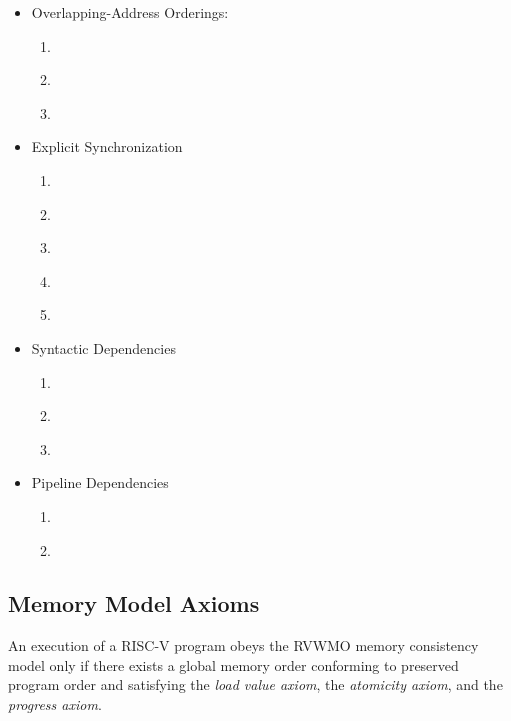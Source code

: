 \begin{itemize}
  \item Overlapping-Address Orderings:
    \begin{enumerate}
      \item\label{ppo:->st} \ppost
      \item\label{ppo:rdw} \ppordw
      \item\label{ppo:amoforward} \ppoamoforward
    \end{enumerate}
  \item Explicit Synchronization
    \begin{enumerate}[resume]
      \item\label{ppo:fence} \ppofence
      \item\label{ppo:acquire} \ppoacquire
      \item\label{ppo:release} \pporelease
      \item\label{ppo:rcsc} \pporcsc
      \item\label{ppo:pair} \ppopair
    \end{enumerate}
  \item Syntactic Dependencies
    \begin{enumerate}[resume]
      \item\label{ppo:addr} \ppoaddr
      \item\label{ppo:data} \ppodata
      \item\label{ppo:ctrl} \ppoctrl
    \end{enumerate}
  \item Pipeline Dependencies
    \begin{enumerate}[resume]
      \item\label{ppo:addrdatarfi} \ppoaddrdatarfi
      \item\label{ppo:addrpo} \ppoaddrpo
    \end{enumerate}
\end{itemize}

\subsection*{Memory Model Axioms}

An execution of a RISC-V program obeys the RVWMO memory consistency model only if there exists a global memory order conforming to preserved program order and satisfying the {\em load value axiom}, the {\em atomicity axiom}, and the {\em progress axiom}.

